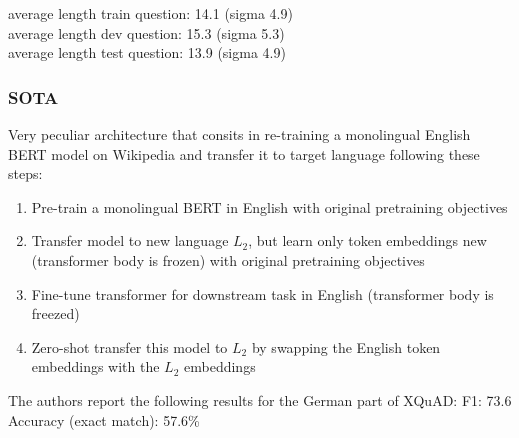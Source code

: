 average length train question: 14.1 (sigma 4.9) \\
average length dev question: 15.3 (sigma 5.3) \\
average length test question: 13.9 (sigma 4.9)


\subsubsection{SOTA}

Very peculiar architecture that consits in re-training a monolingual English BERT model on
Wikipedia and transfer it to target language following these steps:

\begin{enumerate}
    \item Pre-train a monolingual BERT in English with original pretraining objectives
    \item Transfer model to new language $L_2$, but learn only token embeddings new (transformer body is frozen) with original pretraining objectives
    \item Fine-tune transformer for downstream task in English (transformer body is freezed)
    \item Zero-shot transfer this model to $L_2$ by swapping the English token embeddings with the $L_2$ embeddings
\end{enumerate}

The authors report the following results for the German part of XQuAD:
F1: 73.6
Accuracy (exact match): 57.6\%

